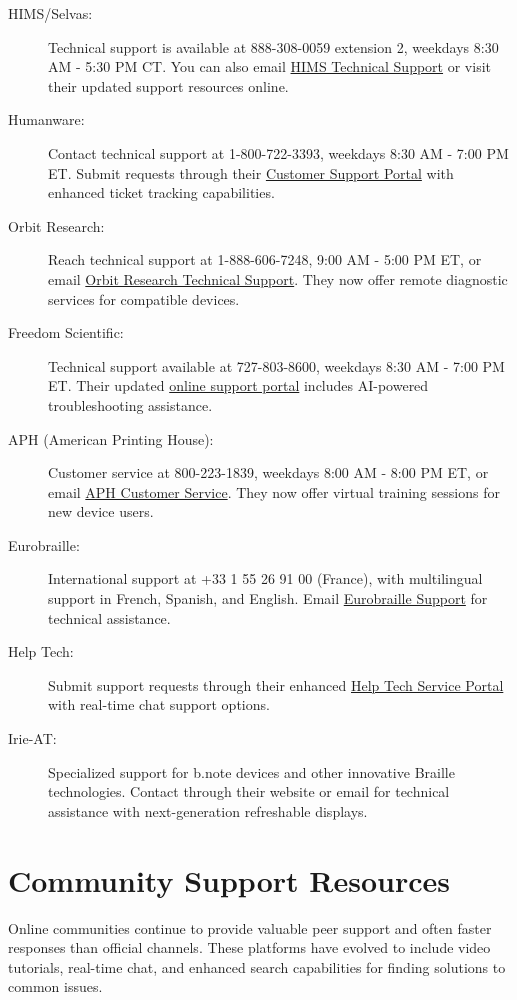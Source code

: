 \begin{description}
    \item[HIMS/Selvas:] Technical support is available at 888-308-0059 extension 2, weekdays 8:30 AM - 5:30 PM CT. You can also email \href{mailto:support@hims-inc.com}{HIMS Technical Support} or visit their updated support resources online.
    \item[Humanware:] Contact technical support at 1-800-722-3393, weekdays 8:30 AM - 7:00 PM ET. Submit requests through their \href{https://store.humanware.com/hus/contact/}{Customer Support Portal} with enhanced ticket tracking capabilities.
    \item[Orbit Research:] Reach technical support at 1-888-606-7248, 9:00 AM - 5:00 PM ET, or email \href{mailto:techsupport@orbitresearch.com}{Orbit Research Technical Support}. They now offer remote diagnostic services for compatible devices.
    \item[Freedom Scientific:] Technical support available at 727-803-8600, weekdays 8:30 AM - 7:00 PM ET. Their updated \href{https://support.freedomscientific.com/Forms/TechSupport}{online support portal} includes AI-powered troubleshooting assistance.
    \item[APH (American Printing House):] Customer service at 800-223-1839, weekdays 8:00 AM - 8:00 PM ET, or email \href{mailto:cs@aph.org}{APH Customer Service}. They now offer virtual training sessions for new device users.
    \item[Eurobraille:] International support at +33 1 55 26 91 00 (France), with multilingual support in French, Spanish, and English. Email \href{mailto:contact@eurobraille.fr}{Eurobraille Support} for technical assistance.
    \item[Help Tech:] Submit support requests through their enhanced \href{https://www.help-tech.com/contact}{Help Tech Service Portal} with real-time chat support options.
    \item[Irie-AT:] Specialized support for b.note devices and other innovative Braille technologies. Contact through their website or email for technical assistance with next-generation refreshable displays.
\end{description}

\section{Community Support Resources}
\label{listserv2}
Online communities continue to provide valuable peer support and often faster responses than official channels. These platforms have evolved to include video tutorials, real-time chat, and enhanced search capabilities for finding solutions to common issues.

